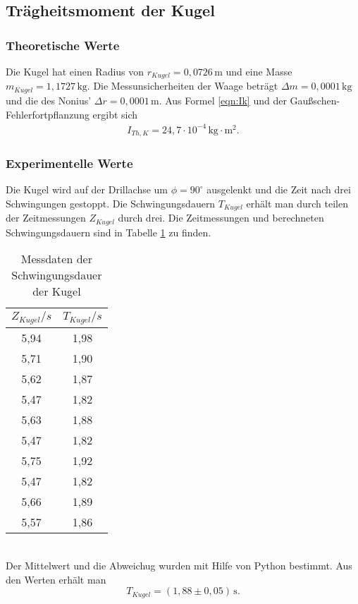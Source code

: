 \subsection{Trägheitsmoment der Kugel}
\label{sec:TraegheitsmomentderKugel}
\subsubsection{Theoretische Werte}
Die Kugel hat einen Radius von $r_{Kugel} = 0{,}0726\,\mathrm{m} $ und eine Masse $m_{Kugel} = 1{,}1727 \,\mathrm{kg} $.
Die Messunsicherheiten der Waage beträgt $\Delta m = 0,0001\, \mathrm{kg}$ und die des Nonius' $\Delta r = 0,0001\, \mathrm{m}$.
Aus Formel \ref{eqn:Ik} und der Gaußschen-Fehlerfortpflanzung ergibt sich
\begin{align*}
  I_{Th, K} = 24{,}7 \cdot 10^{-4} \, \mathrm{kg}\cdot\mathrm{m^2}.
\end{align*}

\subsubsection{Experimentelle Werte}
Die Kugel wird auf der Drillachse um $\phi = 90^{\circ}$ ausgelenkt und die Zeit nach drei
Schwingungen gestoppt. Die Schwingungsdauern $T_{Kugel}$ erhält man durch teilen der Zeitmessungen
$Z_{Kugel}$ durch drei. Die Zeitmessungen und berechneten Schwingungsdauern sind in
Tabelle \ref{tab:T_Kugel} zu finden.
\begin{table}
  \centering
  \caption{Messdaten der Schwingungsdauer der Kugel}
  \label{tab:T_Kugel}
  \begin{tabular}{c c}
    \toprule
    $Z_{Kugel}/s$ & $T_{Kugel}/s$ \\
    \midrule
    5,94 & 1,98 \\
    5,71 & 1,90 \\
    5,62 & 1,87 \\
    5,47 & 1,82 \\
    5,63 & 1,88 \\
    5,47 & 1,82 \\
    5,75 & 1,92 \\
    5,47 & 1,82 \\
    5,66 & 1,89 \\
    5,57 & 1,86 \\
    \bottomrule
  \end{tabular}
\end{table}
\\
Der Mittelwert und die Abweichug wurden mit Hilfe von Python bestimmt. Aus den Werten erhält man
\begin{equation}
  T_{Kugel} = (1{,}88 \pm 0{,}05)\, \mathrm{s} .
\end{equation}

